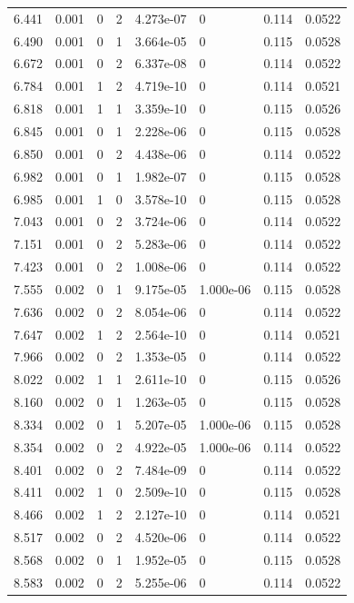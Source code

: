 \documentclass[preview]{standalone}
\begin{document}
{{{\begin{tabular}{L{1.2cm}C{1.2cm} C{0.3cm}C{0.5cm} C{1.4cm}C{1.4cm} C{1.4cm}C{1.4cm}}
  6.441  &  0.001  & 0     &  2 &  4.273e-07  & 0  & 0.114 &  0.0522   \\ 
  6.490  &  0.001  & 0     &  1 &  3.664e-05  & 0  & 0.115 &  0.0528   \\ 
  6.672  &  0.001  & 0     &  2 &  6.337e-08  & 0  & 0.114 &  0.0522   \\ 
  6.784  &  0.001  & 1     &  2 &  4.719e-10  & 0  & 0.114 &  0.0521   \\ 
  6.818  &  0.001  & 1     &  1 &  3.359e-10  & 0  & 0.115 &  0.0526   \\ 
  6.845  &  0.001  & 0     &  1 &  2.228e-06  & 0  & 0.115 &  0.0528   \\ 
  6.850  &  0.001  & 0     &  2 &  4.438e-06  & 0  & 0.114 &  0.0522   \\ 
  6.982  &  0.001  & 0     &  1 &  1.982e-07  & 0  & 0.115 &  0.0528   \\ 
  6.985  &  0.001  & 1     &  0 &  3.578e-10  & 0  & 0.115 &  0.0528   \\ 
  7.043  &  0.001  & 0     &  2 &  3.724e-06  & 0  & 0.114 &  0.0522   \\ 
  7.151  &  0.001  & 0     &  2 &  5.283e-06  & 0  & 0.114 &  0.0522   \\ 
  7.423  &  0.001  & 0     &  2 &  1.008e-06  & 0  & 0.114 &  0.0522   \\ 
  7.555  &  0.002  & 0     &  1 &  9.175e-05  & 1.000e-06  & 0.115 &  0.0528   \\ 
  7.636  &  0.002  & 0     &  2 &  8.054e-06  & 0  & 0.114 &  0.0522   \\ 
  7.647  &  0.002  & 1     &  2 &  2.564e-10  & 0  & 0.114 &  0.0521   \\ 
  7.966  &  0.002  & 0     &  2 &  1.353e-05  & 0  & 0.114 &  0.0522   \\ 
  8.022  &  0.002  & 1     &  1 &  2.611e-10  & 0  & 0.115 &  0.0526   \\ 
  8.160  &  0.002  & 0     &  1 &  1.263e-05  & 0  & 0.115 &  0.0528   \\ 
  8.334  &  0.002  & 0     &  1 &  5.207e-05  & 1.000e-06  & 0.115 &  0.0528   \\ 
  8.354  &  0.002  & 0     &  2 &  4.922e-05  & 1.000e-06  & 0.114 &  0.0522   \\ 
  8.401  &  0.002  & 0     &  2 &  7.484e-09  & 0  & 0.114 &  0.0522   \\ 
  8.411  &  0.002  & 1     &  0 &  2.509e-10  & 0  & 0.115 &  0.0528   \\ 
  8.466  &  0.002  & 1     &  2 &  2.127e-10  & 0  & 0.114 &  0.0521   \\ 
  8.517  &  0.002  & 0     &  2 &  4.520e-06  & 0  & 0.114 &  0.0522   \\ 
  8.568  &  0.002  & 0     &  1 &  1.952e-05  & 0  & 0.115 &  0.0528   \\ 
  8.583  &  0.002  & 0     &  2 &  5.255e-06  & 0  & 0.114 &  0.0522   \\ 
\hline 
\end{tabular} 

}}}
\end{document}
